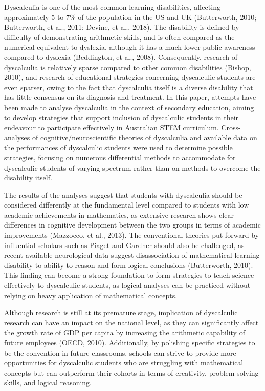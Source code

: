 \documentclass[twoside,14pt,a4paper,notitlepage]{memoir}
\begin{document}
Dyscalculia is one of the most common learning disabilities, affecting approximately 5 to 7\% of the population in the US and UK (Butterworth, 2010; Butterworth, et al., 2011; Devine, et al., 2018). The disability is defined by difficulty of demonstrating arithmetic skills, and is often compared as the numerical equivalent to dyslexia, although it has a much lower public awareness compared to dyslexia (Beddington, et al., 2008). Consequently, research of dyscalculia is relatively sparse compared to other common disabilities (Bishop, 2010), and research of educational strategies concerning dyscalculic students are even sparser, owing to the fact that dyscalculia itself is a diverse disability that has little consensus on its diagnosis and treatment. In this paper, attempts have been made to analyse dyscalculia in the context of secondary education, aiming to develop strategies that support inclusion of dyscalculic students in their endeavour to participate effectively in Australian STEM curriculum. Cross-analyses of cognitive/neuroscientific theories of dyscalculia and available data on the performances of dyscalculic students were used to determine possible strategies, focusing on numerous differential methods to accommodate for dyscalculic students of varying spectrum rather than on methods to overcome the disability itself.

The results of the analyses suggest that students with dyscalculia should be considered differently at the fundamental level compared to students with low academic achievements in mathematics, as extensive research shows clear differences in cognitive development between the two groups in terms of academic improvements (Mazzocco, et al., 2013). The conventional theories put forward by influential scholars such as Piaget and Gardner should also be challenged, as recent available neurological data suggest disassociation of mathematical learning disability to ability to reason and form logical conclusions (Butterworth, 2010). This finding can become a strong foundation to form strategies to teach science effectively to dyscalculic students, as logical analyses can be practiced without relying on heavy application of mathematical concepts.

Although research is still at its premature stage, implication of dyscalculic research can have an impact on the national level, as they can significantly affect the growth rate of GDP per capita by increasing the arithmetic capability of future employees (OECD, 2010). Additionally, by polishing specific strategies to be the convention in future classrooms, schools can strive to provide more opportunities for dyscalculic students who are struggling with mathematical concepts but can outperform their cohorts in terms of creativity, problem-solving skills, and logical reasoning.
\end{document}
